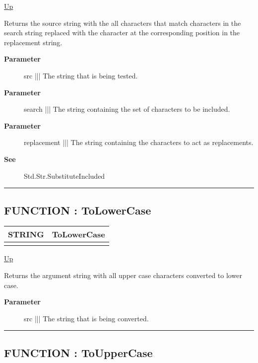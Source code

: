 \hyperlink{ecldoc:Str}{Up}

\par
Returns the source string with the all characters that match characters in the search string replaced with the character at the corresponding position in the replacement string.

\par
\begin{description}
\item [\textbf{Parameter}] src ||| The string that is being tested.
\item [\textbf{Parameter}] search ||| The string containing the set of characters to be included.
\item [\textbf{Parameter}] replacement ||| The string containing the characters to act as replacements.
\item [\textbf{See}] Std.Str.SubstituteIncluded
\end{description}

\rule{\textwidth}{0.4pt}
\subsection*{FUNCTION : ToLowerCase}
\hypertarget{ecldoc:str.tolowercase}{}

{\renewcommand{\arraystretch}{1.5}
\begin{tabularx}{\textwidth}{|>{\raggedright\arraybackslash}l|X|}
\hline
\hspace{0pt}STRING & ToLowerCase \\
\hline
\multicolumn{2}{|>{\raggedright\arraybackslash}X|}{\hspace{0pt}(STRING src)} \\
\hline
\end{tabularx}
}

\hyperlink{ecldoc:Str}{Up}

\par
Returns the argument string with all upper case characters converted to lower case.

\par
\begin{description}
\item [\textbf{Parameter}] src ||| The string that is being converted.
\end{description}

\rule{\textwidth}{0.4pt}
\subsection*{FUNCTION : ToUpperCase}
\hypertarget{ecldoc:str.touppercase}{}

